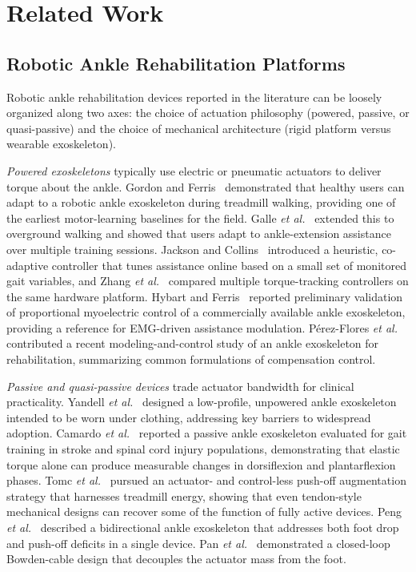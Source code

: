 \documentclass[conference]{IEEEtran}
\begin{document}
\section{Related Work}
\label{sec:related}

\subsection{Robotic Ankle Rehabilitation Platforms}

Robotic ankle rehabilitation devices reported in the literature can be loosely organized along two axes: the choice of actuation philosophy (powered, passive, or quasi-passive) and the choice of mechanical architecture (rigid platform versus wearable exoskeleton).

\emph{Powered exoskeletons} typically use electric or pneumatic actuators to deliver torque about the ankle. Gordon and Ferris~\cite{gordon2007learning} demonstrated that healthy users can adapt to a robotic ankle exoskeleton during treadmill walking, providing one of the earliest motor-learning baselines for the field. Galle \emph{et al.}~\cite{galle2013adaptation} extended this to overground walking and showed that users adapt to ankle-extension assistance over multiple training sessions. Jackson and Collins~\cite{jackson2019heuristic} introduced a heuristic, co-adaptive controller that tunes assistance online based on a small set of monitored gait variables, and Zhang \emph{et al.}~\cite{zhang2015torque} compared multiple torque-tracking controllers on the same hardware platform. Hybart and Ferris~\cite{hybart2022emg} reported preliminary validation of proportional myoelectric control of a commercially available ankle exoskeleton, providing a reference for EMG-driven assistance modulation. P\'erez-Flores \emph{et al.}~\cite{perez2024modeling} contributed a recent modeling-and-control study of an ankle exoskeleton for rehabilitation, summarizing common formulations of compensation control.

\emph{Passive and quasi-passive devices} trade actuator bandwidth for clinical practicality. Yandell \emph{et al.}~\cite{yandell2019profile} designed a low-profile, unpowered ankle exoskeleton intended to be worn under clothing, addressing key barriers to widespread adoption. Camardo \emph{et al.}~\cite{camardo2025passive} reported a passive ankle exoskeleton evaluated for gait training in stroke and spinal cord injury populations, demonstrating that elastic torque alone can produce measurable changes in dorsiflexion and plantarflexion phases. Tomc \emph{et al.}~\cite{tomc2025actuator,tomc2022treadmill} pursued an actuator- and control-less push-off augmentation strategy that harnesses treadmill energy, showing that even tendon-style mechanical designs can recover some of the function of fully active devices. Peng \emph{et al.}~\cite{peng2023bidirectional} described a bidirectional ankle exoskeleton that addresses both foot drop and push-off deficits in a single device. Pan \emph{et al.}~\cite{pan2025bowden} demonstrated a closed-loop Bowden-cable design that decouples the actuator mass from the foot.
\end{document}
